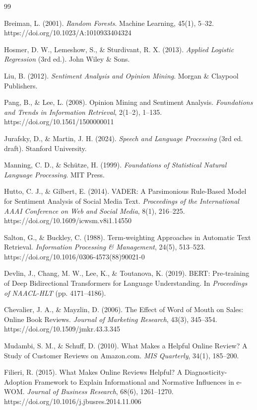 \renewcommand{\bibname}{References}
\begin{thebibliography}{99}

Breiman, L. (2001).
\textit{Random Forests}.
Machine Learning, 45(1), 5--32.
https://doi.org/10.1023/A:1010933404324

Hosmer, D. W., Lemeshow, S., \& Sturdivant, R. X. (2013).
\textit{Applied Logistic Regression} (3rd ed.).
John Wiley \& Sons.

Liu, B. (2012).
\textit{Sentiment Analysis and Opinion Mining}.
Morgan \& Claypool Publishers.

Pang, B., \& Lee, L. (2008).
Opinion Mining and Sentiment Analysis.
\textit{Foundations and Trends in Information Retrieval},
2(1--2), 1--135.
https://doi.org/10.1561/1500000011

Jurafsky, D., \& Martin, J. H. (2024).
\textit{Speech and Language Processing} (3rd ed. draft).
Stanford University.

Manning, C. D., \& Sch\"utze, H. (1999).
\textit{Foundations of Statistical Natural Language Processing}.
MIT Press.

Hutto, C. J., \& Gilbert, E. (2014).
VADER: A Parsimonious Rule-Based Model for Sentiment Analysis of Social Media Text.
\textit{Proceedings of the International AAAI Conference on Web and Social Media},
8(1), 216--225.
https://doi.org/10.1609/icwsm.v8i1.14550

Salton, G., \& Buckley, C. (1988).
Term-weighting Approaches in Automatic Text Retrieval.
\textit{Information Processing \& Management},
24(5), 513--523.
https://doi.org/10.1016/0306-4573(88)90021-0

Devlin, J., Chang, M. W., Lee, K., \& Toutanova, K. (2019).
BERT: Pre-training of Deep Bidirectional Transformers for Language Understanding.
In \textit{Proceedings of NAACL-HLT} (pp. 4171--4186).

Chevalier, J. A., \& Mayzlin, D. (2006).
The Effect of Word of Mouth on Sales: Online Book Reviews.
\textit{Journal of Marketing Research},
43(3), 345--354.
https://doi.org/10.1509/jmkr.43.3.345

Mudambi, S. M., \& Schuff, D. (2010).
What Makes a Helpful Online Review? A Study of Customer Reviews on Amazon.com.
\textit{MIS Quarterly},
34(1), 185--200.

Filieri, R. (2015).
What Makes Online Reviews Helpful? A Diagnosticity-Adoption Framework to Explain Informational and Normative Influences in e-WOM.
\textit{Journal of Business Research},
68(6), 1261--1270.
https://doi.org/10.1016/j.jbusres.2014.11.006


\end{thebibliography}

